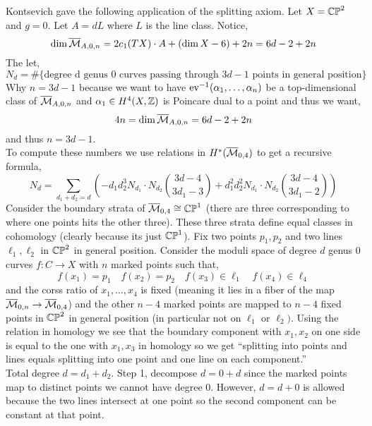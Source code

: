 \documentclass[12pt]{article}
\begin{document}
Kontsevich gave the following application of the splitting axiom. Let $X = \mathbb{CP}^2$ and $g = 0$. Let $A = d L$ where $L$ is the line class. Notice,
\[ \dim{\overline{\mathcal{M}}_{A,0,n}} = 2 c_1(TX) \cdot A + (\dim{X} - 6) + 2n = 6 d  - 2 + 2n \]
The let,
\[ N_d = \# \{ \text{degree d genus 0 curves passing through } 3 d - 1 \text{ points in general position} \} \]
Why $n = 3d - 1$ because we want to have $\mathrm{ev}^{-1}(\alpha_1, \dots, \alpha_n)$ be a top-dimensional class of $\overline{\mathcal{M}}_{A,0,n}$ and $\alpha_1 \in H^4(X, \mathbb{Z})$ is Poincare dual to a point and thus we want,
\[ 4 n = \dim{\overline{\mathcal{M}}_{A,0,n}} = 6 d - 2 + 2n \]
and thus $n = 3d - 1$. 
\bigskip\\
To compute these numbers we use relations in $H^*(\overline{\mathcal{M}}_{0,4})$ to get a recursive formula,
\[ N_d = \sum_{d_1 + d_2 = d} \left( -d_1 d_2^3 N_{d_1} \cdot N_{d_2} {3 d - 4 \choose 3 d_1 - 3} + d_1^2 d_2^2  N_{d_1} \cdot N_{d_2} { 3 d - 4 \choose 3 d_1 - 2} \right) \]
Consider the boundary strata of $\overline{\mathcal{M}}_{0,4} \cong \mathbb{CP}^1$ (there are three corresponding to where one points hits the other three). These three strata define equal classes in cohomology (clearly because its just $\mathbb{CP}^1$). Fix two points $p_1, p_2$ and two lines $\ell_1, \ell_2$ in $\mathbb{CP}^2$ in general position. Consider the moduli space of degree $d$ genus $0$ curves $f : C \to X$ with $n$ marked points such that,
\[ f(x_1) = p_1 \quad f(x_2) = p_2 \quad f(x_3) \in \ell_1 \quad f(x_4) \in \ell_4 \]
and the corss ratio of $x_1, \dots, x_4$ is fixed (meaning it lies in a fiber of the map $\overline{\mathcal{M}}_{0,n} \to \overline{\mathcal{M}}_{0,4}$) and the other $n - 4$ marked points are mapped to $n - 4$ fixed points in $\mathbb{CP}^2$ in general position (in particular not on $\ell_1$ or $\ell_2)$. Using the relation in homology we see that the boundary component with $x_1, x_2$ on one side is equal to the one with $x_1, x_3$ in homology so we get ``splitting into points and lines equals splitting into one point and one line on each component.''
\bigskip\\
Total degree $d = d_1 + d_2$. Step 1, decompose $d = 0 + d$ since the marked points map to distinct points we cannot have degree $0$. However, $d = d + 0$ is allowed because the two lines intersect at one point so the second component can be constant at that point. 
\end{document}
